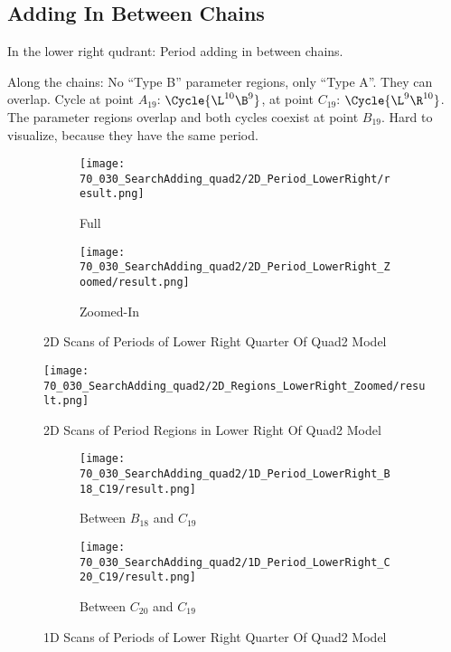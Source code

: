 \subsection{Adding In Between Chains}

In the lower right qudrant: Period adding in between chains.

Along the chains: No ``Type B'' parameter regions, only ``Type A''.
They can overlap.
Cycle at point $A_{19}$: $\Cycle{\L^{10}\B^9}$, at point $C_{19}$: $\Cycle{\L^9\R^{10}}$.
The parameter regions overlap and both cycles coexist at point $B_{19}$.
Hard to visualize, because they have the same period.

\begin{figure}
    \centering
    \begin{subfigure}{0.4\textwidth}
        \centering
        \texttt{[image: 70\_030\_SearchAdding\_quad2/2D\_Period\_LowerRight/result.png]}
        \caption{Full}
    \end{subfigure}
    \begin{subfigure}{0.4\textwidth}
        \centering
        \texttt{[image: 70\_030\_SearchAdding\_quad2/2D\_Period\_LowerRight\_Zoomed/result.png]}
        \caption{Zoomed-In}
    \end{subfigure}
    \caption{2D Scans of Periods of Lower Right Quarter Of Quad2 Model}
\end{figure}

\begin{figure}
    \centering
    \texttt{[image: 70\_030\_SearchAdding\_quad2/2D\_Regions\_LowerRight\_Zoomed/result.png]}
    \caption{2D Scans of Period Regions in Lower Right Of Quad2 Model}
\end{figure}

\begin{figure}
    \centering
    \begin{subfigure}{0.4\textwidth}
        \centering
        \texttt{[image: 70\_030\_SearchAdding\_quad2/1D\_Period\_LowerRight\_B18\_C19/result.png]}
        \caption{Between $B_{18}$ and $C_{19}$}
    \end{subfigure}
    \begin{subfigure}{0.4\textwidth}
        \centering
        \texttt{[image: 70\_030\_SearchAdding\_quad2/1D\_Period\_LowerRight\_C20\_C19/result.png]}
        \caption{Between $C_{20}$ and $C_{19}$}
    \end{subfigure}
    \caption{1D Scans of Periods of Lower Right Quarter Of Quad2 Model}
\end{figure}

